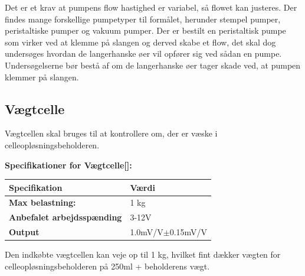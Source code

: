 Det er et krav at pumpens flow hastighed er variabel, så flowet kan justeres. Der findes mange forskellige pumpetyper til formålet, herunder stempel pumper, peristaltiske pumper og vakuum pumper. Der er bestilt en peristaltisk pumpe som virker ved at klemme på slangen og derved skabe et flow, det skal dog undersøges hvordan de langerhanske øer vil opfører sig ved sådan en pumpe. Undersøgelserne bør bestå af om de langerhanske øer tager skade ved, at pumpen klemmer på slangen. 

\subsection{Vægtcelle}
\label{subsec:loadcell}
Vægtcellen skal bruges til at kontrollere om, der er væske i celleopløsningsbeholderen.

\textbf{Specifikationer for Vægtcelle[\citet{DH7}]:} 
\begin{center}
		\begin{longtable}{ | m{6.5cm} | m{6.5cm}| } 
			\hline
			\textbf{Specifikation} &\textbf{Værdi} \\ 
			\hline
			\textbf{Max belastning:} & 1 kg \\ 
			\hline
			\textbf{Anbefalet arbejdsspænding} & 3-12V \\ 
			\hline
			\textbf{Output} & 1.0mV/V$\pm$0.15mV/V \\ 
			\hline
		\end{longtable}
\end{center}

Den indkøbte vægtcellen kan veje op til 1 kg, hvilket fint dækker vægten for celleopløsningsbeholderen på 250ml + beholderens vægt.



